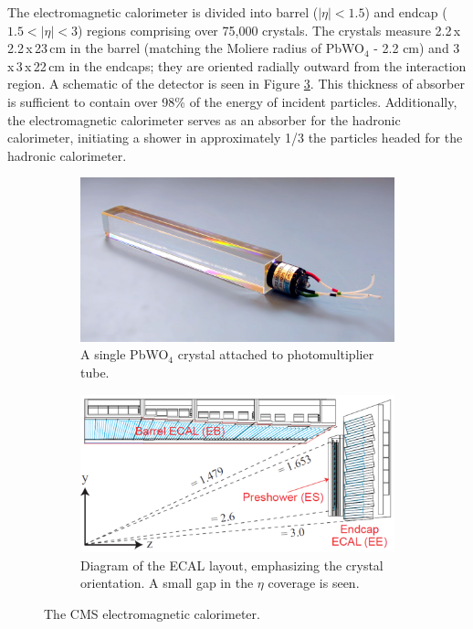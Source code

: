 The electromagnetic calorimeter is divided into barrel ($|\eta|<1.5$) and endcap ($1.5<|\eta|<3$) regions comprising over 75,000 crystals. The crystals measure 2.2$\,$x$\,$2.2$\,$x$\,$23$\,$cm in the barrel (matching the Moliere radius of PbWO$_{4}$ - 2.2 cm) and 3$\,$x$\,$3$\,$x$\,$22$\,$cm in the endcaps; they are oriented radially outward from the interaction region. A schematic of the detector is seen in Figure \ref{fig:ecal}. This thickness of absorber is sufficient to contain over 98\% of the energy of incident particles. Additionally, the electromagnetic calorimeter serves as an absorber for the hadronic calorimeter, initiating a shower in approximately 1/3 the particles headed for the hadronic calorimeter.

\begin{figure}[hb!]
\centering
\begin{subfigure}[b]{0.35\textwidth}
\includegraphics[width=\textwidth]{figs/ecalcrystal.jpg}
\caption{A single PbWO$_{4}$ crystal attached to photomultiplier tube.}
\label{fig:ecalcrystal}
\end{subfigure}
\begin{subfigure}[b]{0.625\textwidth}
\includegraphics[width=\textwidth]{figs/ecal.png}
\caption{Diagram of the ECAL layout, emphasizing the crystal orientation. A small gap in the $\eta$ coverage is seen.}
\label{fig:ecal}
\end{subfigure}
\caption{The CMS electromagnetic calorimeter.}
\end{figure}

